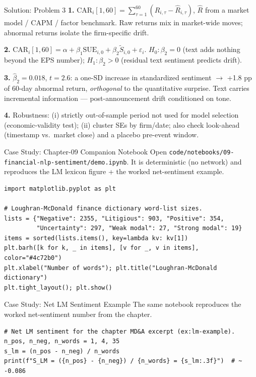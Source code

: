 \documentclass[9pt,t]{beamer}
\begin{document}
\begin{frame}{Solution: Problem 3}
\textbf{1.} $\mathrm{CAR}_i[1,60]=\sum_{\tau=1}^{60}(R_{i,\tau}-\hat R_{i,\tau})$,
$\hat R$ from a market model / CAPM / factor benchmark. Raw returns mix in
market-wide moves; abnormal returns isolate the firm-specific drift.

\medskip
\textbf{2.} $\mathrm{CAR}_i[1,60]=\alpha+\beta_1\mathrm{SUE}_{i,0}+\beta_2\tilde S_{i,0}+\varepsilon_i$.
$H_0:\beta_2=0$ (text adds nothing beyond the EPS number);
$H_1:\beta_2>0$ (residual text sentiment predicts drift).

\medskip
\textbf{3.} $\hat\beta_2=0.018$, $t=2.6$: a one-SD increase in standardized
sentiment $\to$ +1.8 pp of 60-day abnormal return, \emph{orthogonal} to the
quantitative surprise. Text carries incremental information --- post-announcement
drift conditioned on tone.

\medskip
\textbf{4.} Robustness: (i) strictly out-of-sample period not used for model
selection (economic-validity test); (ii) cluster SEs by firm/date; also check
look-ahead (timestamp vs.\ market close) and a placebo pre-event window.
\end{frame}

\begin{frame}[fragile]{Case Study: Chapter-09 Companion Notebook}
Open \texttt{code/notebooks/09-financial-nlp-sentiment/demo.ipynb}. It is
deterministic (no network) and reproduces the LM lexicon figure + the worked
net-sentiment example.

\begin{lstlisting}
import matplotlib.pyplot as plt

# Loughran-McDonald finance dictionary word-list sizes.
lists = {"Negative": 2355, "Litigious": 903, "Positive": 354,
         "Uncertainty": 297, "Weak modal": 27, "Strong modal": 19}
items = sorted(lists.items(), key=lambda kv: kv[1])
plt.barh([k for k, _ in items], [v for _, v in items], color="#4c72b0")
plt.xlabel("Number of words"); plt.title("Loughran-McDonald dictionary")
plt.tight_layout(); plt.show()
\end{lstlisting}
\end{frame}

\begin{frame}[fragile]{Case Study: Net LM Sentiment Example}
The same notebook reproduces the worked net-sentiment number from the chapter.

\begin{lstlisting}
# Net LM sentiment for the chapter MD&A excerpt (ex:lm-example).
n_pos, n_neg, n_words = 1, 4, 35
s_lm = (n_pos - n_neg) / n_words
print(f"S_LM = ({n_pos} - {n_neg}) / {n_words} = {s_lm:.3f}")  # ~ -0.086
\end{lstlisting}
\end{frame}
\end{document}
